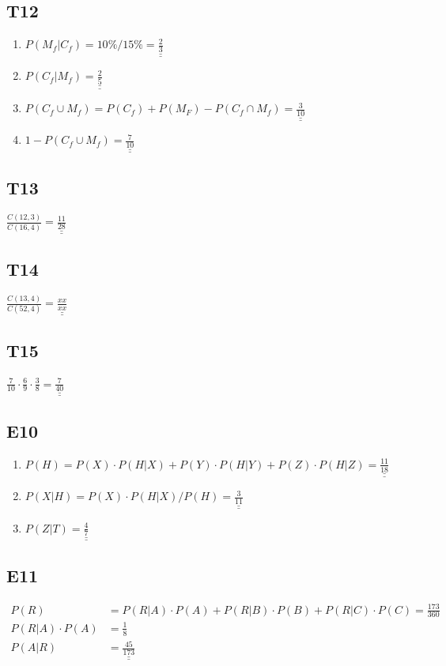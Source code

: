 \documentclass[12pt, a4paper]{article}
\begin{document}
\subsection* {T12}
\begin{enumerate}
  \item $P(M_f|C_f) = 10\% / 15 \% =  \underline{\underline{ \frac{2}{3} }} $
  \item  $P(C_f|M_f) = \underline{\underline{ \frac{2}{5}  }} $
  \item  $P(C_f \cup M_f) = P(C_f) + P(M_F) - P(C_f \cap M_f)=  \underline{\underline{ \frac{3}{10}  }}$
  \item  $ 1 - P(C_f \cup M_f) =  \underline{\underline{ \frac{7}{10}  }}$
\end{enumerate}

\subsection* {T13}
$ \frac{C(12,3) }{C(16,4)} =  \underline{\underline{ \frac{11}{28} }}$

\subsection* {T14}
$ \frac{C(13,4) }{C(52,4)} =  \underline{\underline{ \frac{xx}{xx} }}$

\subsection* {T15}
$ \frac{7}{10} \cdot \frac{6}{9} \cdot \frac{3}{8} =  \underline{\underline{ \frac{7}{40} }}$

\subsection* {E10}
\begin{enumerate}
  \item $P(H) = P(X)\cdot P(H | X) + P(Y)\cdot P(H | Y) + P(Z)\cdot P(H | Z) = \underline{\underline{ \frac{11}{18} }} $
  \item  $P(X | H) = P(X)\cdot P(H|X) / P(H) =  \underline{\underline{ \frac{3}{11}  }}$
  \item  $P(Z | T) =  \underline{\underline{ \frac{4}{7}  }}$
\end{enumerate}

\subsection* {E11}
\begin{align*}
	P(R) &= P(R|A)\cdot P(A) + P(R|B)\cdot P(B) + P(R|C)\cdot P(C) = \frac{173}{360} \\
	P(R|A)·P(A) &= \frac{1}{8} \\
	P(A|R) &=\underline{\underline{  \frac{45}{173} }} \\
\end{align*}
\end{document}
